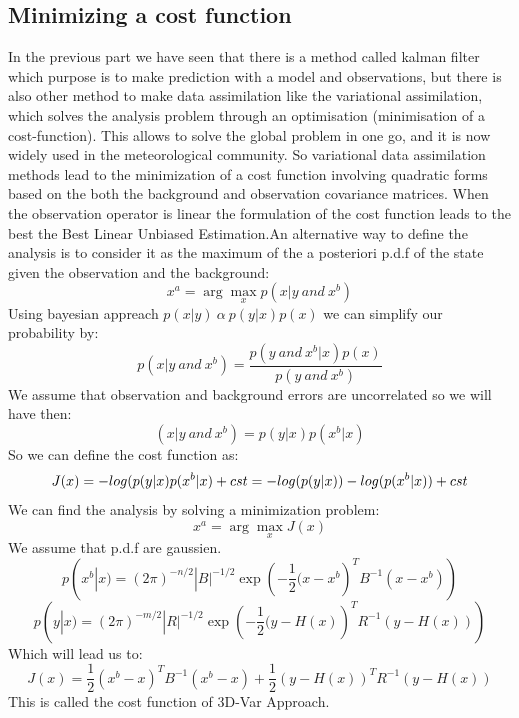 \documentclass{article}
\begin{document}
\subsection{Minimizing a cost function}
\noindent In the previous part we have seen that there is a method called kalman filter which purpose is to make prediction with a model and observations, but there is also other method to make data assimilation like the variational assimilation, which solves the analysis problem through an optimisation (minimisation of a cost-function). This allows to solve the global problem in one go, and it is now widely used in the meteorological community. So variational data assimilation methods lead to the minimization of a cost function involving quadratic forms based on the both the background and observation covariance matrices. When the observation operator is linear the formulation of the cost function leads to the best the Best Linear Unbiased Estimation.An alternative way to define the analysis is to consider it as the maximum of the a posteriori p.d.f of the state given the observation and the background:
$$x^a=\arg\max_{x}p(x|y ~ and ~ x^b)$$
Using bayesian appreach $p(x|y)~\alpha~ p(y|x)p(x)$ we can simplify our probability by:
$$p(x|y ~ and ~ x^b)=\frac{p(y ~ and ~ x^b| x)p(x)}{p(y ~ and ~ x^b)}$$
We assume that observation and background errors are uncorrelated so we will have then:
$$(x|y ~ and ~ x^b)=p(y|x)p(x^b|x)$$
So we can define the cost function as:
$$J(x)=-log(p(y|x)p(x^b|x)+cst \\
=-log(p(y|x))-log(p(x^b|x))+cst$$
We can find the analysis by solving a minimization problem:
$$x^a=\arg\max_{x}J(x)$$
We assume that p.d.f are gaussien.
$$p(x^b|x)=(2\pi)^{-n/2}|B|^{-1/2}\exp({-\frac{1}{2}(x-x^b})^TB^{-1}(x-x^b))$$
$$p(y|x)=(2\pi)^{-m/2}|R|^{-1/2}\exp({-\frac{1}{2}(y-H(x)})^TR^{-1}(y-H(x)))$$
Which will lead us to:
$$J(x)=\frac{1}{2}(x^b-x)^TB^{-1}(x^b-x)+\frac{1}{2}(y-H(x))^TR^{-1}(y-H(x))$$
This is called the cost function of 3D-Var Approach.
\end{document}
